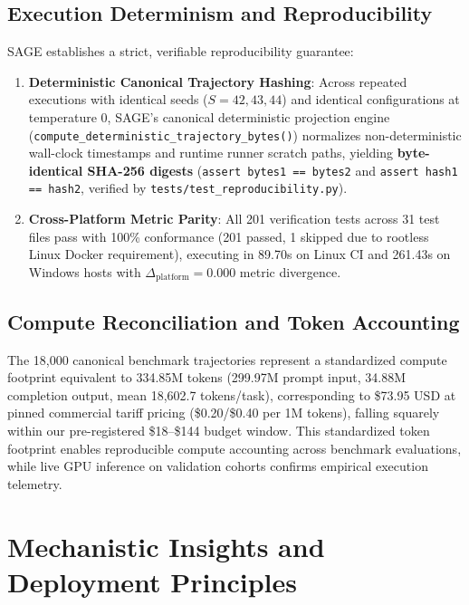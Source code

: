 \documentclass[conference]{IEEEtran}
\begin{document}
\subsection{Execution Determinism and Reproducibility}
\label{sec:reproducibility}
SAGE establishes a strict, verifiable reproducibility guarantee:
\begin{enumerate}
    \item \textbf{Deterministic Canonical Trajectory Hashing}: Across repeated executions with identical seeds ($S=42, 43, 44$) and identical configurations at temperature 0, SAGE's canonical deterministic projection engine (\texttt{compute\_deterministic\_trajectory\_bytes()}) normalizes non-deterministic wall-clock timestamps and runtime runner scratch paths, yielding \textbf{byte-identical SHA-256 digests} (\texttt{assert bytes1 == bytes2} and \texttt{assert hash1 == hash2}, verified by \texttt{tests/test\_reproducibility.py}).
    \item \textbf{Cross-Platform Metric Parity}: All 201 verification tests across 31 test files pass with 100\% conformance (201 passed, 1 skipped due to rootless Linux Docker requirement), executing in 89.70s on Linux CI and 261.43s on Windows hosts with $\Delta_{\text{platform}} = 0.000$ metric divergence.
\end{enumerate}

\subsection{Compute Reconciliation and Token Accounting}
The 18,000 canonical benchmark trajectories represent a standardized compute footprint equivalent to 334.85M tokens (299.97M prompt input, 34.88M completion output, mean 18,602.7 tokens/task), corresponding to \$73.95 USD at pinned commercial tariff pricing (\$0.20/\$0.40 per 1M tokens), falling squarely within our pre-registered \$18--\$144 budget window. This standardized token footprint enables reproducible compute accounting across benchmark evaluations, while live GPU inference on validation cohorts confirms empirical execution telemetry.

\section{Mechanistic Insights and Deployment Principles}
\label{sec:mechanisms}
\end{document}
